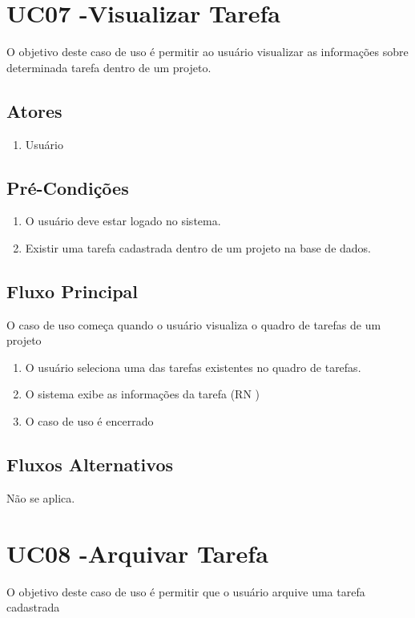 \section{UC07 -Visualizar Tarefa}
O objetivo deste caso de uso é permitir ao usuário visualizar as informações sobre determinada tarefa dentro de um projeto.

\subsection{Atores}

\begin{enumerate}
  \item Usuário
\end{enumerate}

\subsection{Pré-Condições}
\begin{enumerate}
  \item O usuário deve estar logado no sistema.
  \item Existir uma tarefa cadastrada dentro de um projeto na base de dados.
\end{enumerate}

\subsection{Fluxo Principal}
O caso de uso começa quando o usuário visualiza o quadro de tarefas de um projeto

\begin{enumerate}
  \item O usuário seleciona uma das tarefas existentes no quadro de tarefas.
  \item O sistema exibe as informações da tarefa (RN )
  \item O caso de uso é encerrado
\end{enumerate}

\subsection{Fluxos Alternativos}
Não se aplica.

\section{UC08 -Arquivar Tarefa}
O objetivo deste caso de uso é permitir que o usuário arquive uma tarefa cadastrada

